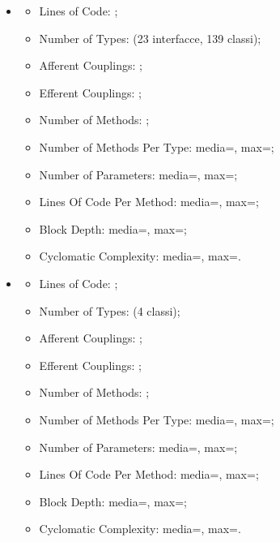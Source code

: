 \begin{itemize}
    \item {}
  \begin{itemize}
  \item Lines of Code: ;
  \item Number of Types:  (23 interfacce, 139 classi);
  \item Afferent Couplings: ;
  \item Efferent Couplings: ;
  \item Number of Methods: ;
  \item Number of Methods Per Type: media=, max=;
  \item Number of Parameters: media=, max=;
  \item Lines Of Code Per Method: media=, max=;
  \item Block Depth: media=, max=;
  \item Cyclomatic Complexity: media=, max=.
  \end{itemize}
    \item {}
  \begin{itemize}
  \item Lines of Code: ;
  \item Number of Types:  (4 classi);
  \item Afferent Couplings: ;
  \item Efferent Couplings: ;
  \item Number of Methods: ;
  \item Number of Methods Per Type: media=, max=;
  \item Number of Parameters: media=, max=;
  \item Lines Of Code Per Method: media=, max=;
  \item Block Depth: media=, max=;
  \item Cyclomatic Complexity: media=, max=.
  \end{itemize}
\end{itemize}  

